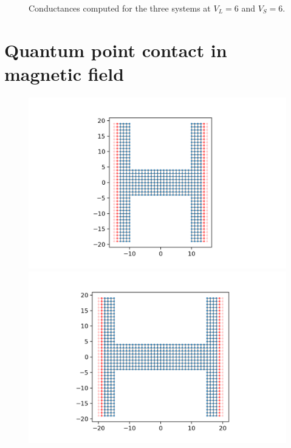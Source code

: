 \documentclass[12pt]{article}
\numberwithin{equation}{section}
\begin{document}
\begin{figure}
\begin{minipage}{0.333\textwidth}
  \end{minipage}
  \caption{Conductances computed for the three systems at $V_L=6$ and $V_S=6$.}
\end{figure}

\newpage
\section{Quantum point contact in magnetic field}
\begin{figure}
  \centering
  \begin{minipage}{0.49\textwidth}
    \centering
    \includegraphics[width=1.0\textwidth]{./media/qpc_L10_W5.png} %
\end{minipage}\hfill
  \begin{minipage}{0.49\textwidth}
      \centering
      \includegraphics[width=1.0\textwidth]{./media/qpc_L15_W5.png} %
  \end{minipage}
\end{figure}
\end{document}

